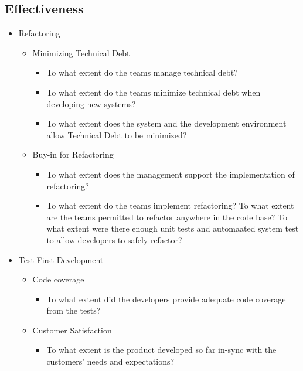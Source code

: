 \begin{appendices}
\section{Effectiveness}

\begin{itemize}
	\item Refactoring 
		\begin{itemize}
			\item Minimizing Technical Debt 
				\begin{itemize}
					\item To what extent do the teams manage technical debt? 
					\item To what extent do the teams minimize technical debt when developing new systems? 
					\item To what extent does the system and the development environment allow Technical Debt to be minimized? 
				\end{itemize}
			\item Buy-in for Refactoring 
				\begin{itemize}
					\item To what extent does the management support the implementation of refactoring? 
					\item To what extent do the teams implement refactoring? 
					\addition To what extent are the teams permitted to refactor anywhere in the code base?			
					\addition To what extent were there enough unit tests and automaated system test to allow developers to safely refactor?					
				\end{itemize}
		\end{itemize}
	\item Test First Development
		\begin{itemize}
			\item Code coverage
				\begin{itemize}
					\item To what extent did the developers provide adequate code coverage from the tests?
				\end{itemize}
		\end{itemize}
		\begin{itemize}
			\item Customer Satisfaction
				\begin{itemize}
					\item To what extent is the product developed so far in-sync with the customers' needs and expectations?

\end{itemize}
\end{itemize}
\end{itemize}
\end{appendices}
